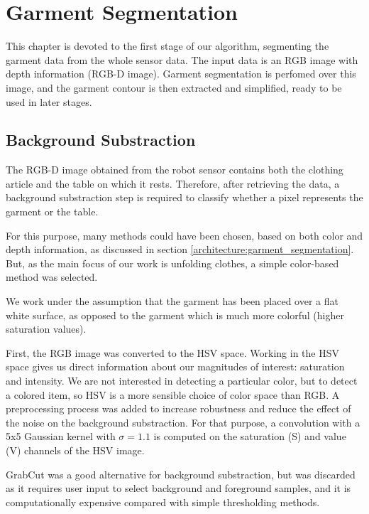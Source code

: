 \chapter{Garment Segmentation}
\label{garment_segmentation}

This chapter is devoted to the first stage of our algorithm, segmenting the garment data from the whole sensor data. The input data is an RGB image with depth information (RGB-D image). Garment segmentation is perfomed over this image, and the garment contour is then extracted and simplified, ready to be used in later stages.


\section{Background Substraction}
\label{background_substraction}

The RGB-D image obtained from the robot sensor contains both the clothing article and the table on which it rests. Therefore, after retrieving the data, a background substraction step is required to classify whether a pixel represents the garment or the table.

For this purpose, many methods could have been chosen, based on both color and depth information, as discussed in section \ref{architecture:garment_segmentation}. But, as the main focus of our work is unfolding clothes, a simple color-based method was selected. 

We work under the assumption that the garment has been placed over a flat white surface, as opposed to the garment which is much more colorful (higher saturation values). 

First, the RGB image was converted to the HSV space. Working in the HSV space gives us direct information about our magnitudes of interest: saturation and intensity. We are not interested in detecting a particular color, but to detect a colored item, so HSV is a more sensible choice of color space than RGB. A  preprocessing process was added to increase robustness and reduce the effect of the noise on the background substraction. For that purpose, a convolution with a 5x5 Gaussian kernel with $\sigma=1.1$ is computed on the saturation (S) and value (V) channels of the HSV image.

GrabCut  was a good alternative for background substraction, but was discarded as it requires user input to select background and foreground samples, and it is computationally expensive compared with simple thresholding methods.

